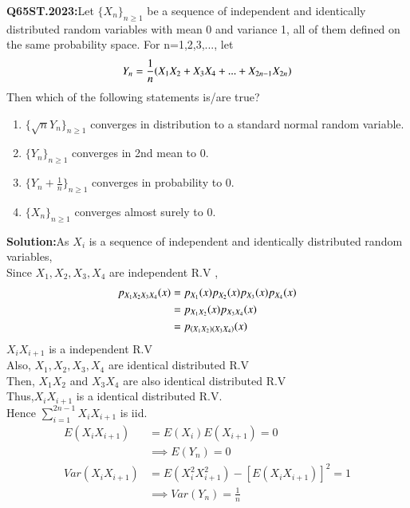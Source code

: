 \documentclass[journal,12pt,Twocolumn]{IEEEtran}
\theoremstyle{remark}
\begin{document}

\textbf{Q65ST.2023:}Let $\{X_n\}_{n \geq 1}$ be a sequence of independent and identically distributed random variables with mean 0 and variance 1, all of them defined on the same
probability space. For n=1,2,3,..., let
\begin{align}
Y_n=\frac{1}{n}{\left(X_1X_2+X_3X_4+...+X_{2n-1}X_{2n}\right)} 
\end{align}
Then which of the following statements is/are true? 
\begin{enumerate}[label=(\Alph*)]
\item $\{\sqrt{n}Y_n\}_{n \geq 1}$ converges in distribution to a standard normal random variable.
\item $\{Y_n\}_{n \geq 1}$ converges in 2nd mean to 0.
\item $\{Y_n+\frac{1}{n}\}_{n \geq 1}$ converges in probability to 0.
\item $\{X_n\}_{n \geq 1}$ converges almost surely to 0.
\end{enumerate}
\textbf{Solution:}As $X_i$ is a sequence of independent and identically distributed random variables, \\ 
Since $X_1,X_2,X_3,X_4$ are independent R.V ,
\begin{align}
p_{X_1X_2X_3X_4}(x) &= p_{X_1}(x)p_{X_2}(x)p_{X_3}(x)p_{X_4}(x) \\
&= p_{X_1X_2}(x)p_{X_3X_4}(x) \\
&= p_{\left(X_1X_2\right)\left(X_3X_4\right)}(x) 
\end{align}
$X_iX_{i+1}$ is a independent R.V \\
Also, $X_1,X_2,X_3,X_4$ are identical distributed R.V \\
Then, $X_1X_2$ and $X_3X_4$ are also identical distributed R.V \\
Thus,$X_iX_{i+1}$ is a identical distributed R.V. \\
Hence $\sum_{i=1}^{2n-1} X_iX_{i+1}$ is iid.
\begin{align}
E(X_iX_{i+1})&=E(X_i)E(X_{i+1})=0 \\
&\label{65/st/23:eq3}\implies E(Y_n)=0 \\
Var(X_iX_{i+1})&=E(X_{i}^2X_{i+1}^2)-[E(X_iX_{i+1})]^2 = 1 \\
&\label{65/st/23:eq5}\implies Var(Y_n)=\frac{1}{n} \\
\end{align}
\end{document}
